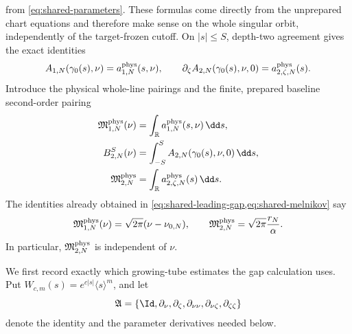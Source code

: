 from \cref{eq:shared-parameters}.  These formulas come directly from the
unprepared chart equations and therefore make sense on the whole singular
orbit, independently of the target-frozen cutoff.  On \(|s|\le S\),
depth-two agreement gives the exact identities
\begin{equation}
 A_{1,N}(\gamma_0(s),\nu)=a^{\rm phys}_{1,N}(s,\nu),
 \qquad
 \partial_\zeta A_{2,N}(\gamma_0(s),\nu,0)
   =a^{\rm phys}_{2,\zeta,N}(s).                    \label{eq:gap-central-physical-agreement}
\end{equation}
Introduce the physical whole-line pairings and the finite, prepared
baseline second-order pairing
\begin{align}
 \mathfrak M_{1,N}^{\rm phys}(\nu)
 &=\int_{\mathbb R}a^{\rm phys}_{1,N}(s,\nu)\,\dd s,
                                                        \label{eq:gap-M1}\\
 B_{2,N}^{S}(\nu)
 &=\int_{-S}^{S}A_{2,N}(\gamma_0(s),\nu,0)\,\dd s,
                                                        \label{eq:gap-B2}\\
 \mathfrak M_{2,N}^{\rm phys}
 &=\int_{\mathbb R}a^{\rm phys}_{2,\zeta,N}(s)\,\dd s.
                                                        \label{eq:gap-M2}
\end{align}
The identities already obtained in
\cref{eq:shared-leading-gap,eq:shared-melnikov} say
\begin{equation}
 \mathfrak M_{1,N}^{\rm phys}(\nu)
   =\sqrt{2\pi}(\nu-\nu_{0,N}),
 \qquad
 \mathfrak M_{2,N}^{\rm phys}
   =\sqrt{2\pi}\frac{r_N}{\alpha}.                 \label{eq:gap-leading-pairings}
\end{equation}
In particular, \(\mathfrak M_{2,N}^{\rm phys}\) is independent of
\(\nu\).

We first record exactly which growing-tube estimates the gap calculation
uses.  Put \(W_{c,m}(s)=e^{c|s|}\langle s\rangle^m\), and let
\[
 \mathfrak A=\{\Id,\partial_\nu,\partial_\zeta,
 \partial_{\nu\nu},\partial_{\nu\zeta},
 \partial_{\zeta\zeta}\}
\]
denote the identity and the parameter derivatives needed below.

